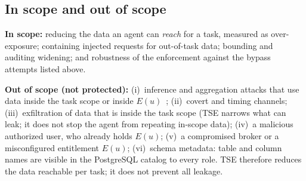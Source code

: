 \subsection{In scope and out of scope}
\textbf{In scope:} reducing the data an agent can \emph{reach} for a task, measured as over-exposure; containing
injected requests for out-of-task data; bounding and auditing widening; and robustness of the enforcement
against the bypass attempts listed above.

\textbf{Out of scope (not protected):}
(i)~inference and aggregation attacks that use data inside the task scope or inside $E(u)$~\cite{denning1979tracker,adam1989security};
(ii)~covert and timing channels;
(iii)~exfiltration of data that is inside the task scope (TSE narrows what can leak; it does not stop the agent
from repeating in-scope data);
(iv)~a malicious authorized user, who already holds $E(u)$;
(v)~a compromised broker or a misconfigured entitlement $E(u)$;
(vi)~schema metadata: table and column names are visible in the PostgreSQL catalog to every role.
TSE therefore reduces the data reachable per task; it does not prevent all leakage.
